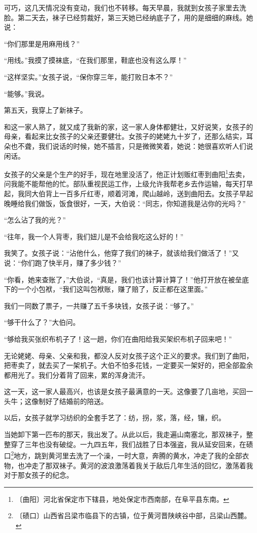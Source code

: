 \documentclass[12pt,UTF-8,openany]{ctexbook}
\begin{document}
\begin{normalsize}
    可巧，这几天情况没有变动，我们也不转移。每天早晨，我就到女孩子家里去洗脸。第二天去，袜子已经剪裁好，第三天她已经纳底子了，用的是细细的麻线。她说：
    
    “你们那里是用麻用线？”
    
    “用线。”我摸了摸袜底，“在我们那里，鞋底也没有这么厚！”
    
    “这样坚实。”女孩子说，“保你穿三年，能打败日本不？”
    
    “能够。”我说。
    
    第五天，我穿上了新袜子。
    
    和这一家人熟了，就又成了我新的家，这一家人身体都健壮，又好说笑，女孩子的母亲，看起来比女孩子的父亲还要健壮。女孩子的姥姥九十岁了，还那么结实，耳朵也不聋，我们说话的时候，她不插言，只是微微笑着，她说：她很喜欢听人们说闲话。
    
    女孩子的父亲是个生产的好手，现在地里没活了，他正计划贩红枣到曲阳\footnote{〔曲阳〕河北省保定市下辖县，地处保定市西南部，在阜平县东南。}去卖，问我能不能帮他的忙。部队重视民运工作，上级允许我帮老乡去作运输，每天打早起，我同大伯背上一百多斤红枣，顺着河滩，爬山越岭，送到曲阳去。女孩子早起晚睡给我们做饭，饭食很好，一天，大伯说：“同志，你知道我是沾你的光吗？”
    
    “怎么沾了我的光？”
    
    “往年，我一个人背枣，我们妞儿是不会给我吃这么好的！”
    
    我笑了。女孩子说：“沾他什么，他穿了我们的袜子，就该给我们做活了！”又说：“你们跑了快半月，赚了多少钱？”
    
    “你看，她来查账了，”大伯说，“真是，我们也该计算计算了！”他打开放在被垒底下的一个小包袱，“我们这叫包袱账，赚了赔了，反正都在这里面。”
    
    我们一同数了票子，一共赚了五千多块钱，女孩子说：“够了。”
    
    “够干什么了？”大伯问。
    
    “够给我买张织布机子了！这一趟，你们在曲阳给我买架织布机子回来吧！”
    
    无论姥姥、母亲、父亲和我，都没人反对女孩子这个正义的要求。我们到了曲阳，把枣卖了，就去买了一架机子。大伯不怕多花钱，一定要买一架好的，把全部盈余都用光了。我们分着背了回来，累的浑身流汗。
    
    这一天，这一家人最高兴，也该是女孩子最满意的一天。这像要了几亩地，买回一头牛；这像制好了结婚前的陪送。
    
    以后，女孩子就学习纺织的全套手艺了：纺，拐，浆，落，经，镶，织。
    
    当她卸下第一匹布的那天，我出发了。从此以后，我走遍山南塞北，那双袜子，整整穿了三年也没有破绽。一九四五年，我们战胜了日本强盗，我从延安回来，在碛口\footnote{〔碛口〕山西省吕梁市临县下的古镇，位于黄河晋陕峡谷中部，吕梁山西麓。}地方，跳到黄河里去洗了一个澡，一时大意，奔腾的黄水，冲走了我的全部衣物，也冲走了那双袜子。黄河的波浪激荡着我关于敌后几年生活的回忆，激荡着我对于那女孩子的纪念。
    

\end{normalsize}
\end{document}
